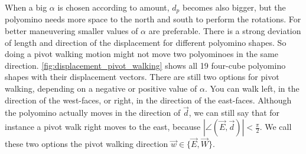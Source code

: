 When a big $\alpha$ is chosen according to amount, $d_p$ becomes also bigger, but the polyomino needs more space to the north and south to perform the rotations.
For better maneuvering smaller values of $\alpha$ are preferable.
There is a strong deviation of length and direction of the displacement for different polyomino shapes.
So doing a pivot walking motion might not move two polyominoes in the same direction.
\autoref{fig:displacement_pivot_walking} shows all 19 four-cube polyomino shapes with their displacement vectors.
There are still two options for pivot walking, depending on a negative or positive value of $\alpha$.
You can walk left, in the direction of the west-faces, or right, in the direction of the east-faces.
Although the polyomino actually moves in the direction of $\vec{d}$, we can still say that for instance a pivot walk right moves to the east, because $\left| \angle \left( \vec{E}, \vec{d} \right) \right| < \frac{\pi}{2}$.
We call these two options the pivot walking direction $\vec{w} \in \{\vec{E}, \vec{W}\}$.
